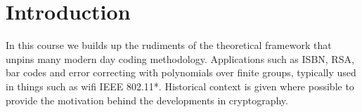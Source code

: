 \section{Introduction} %
\label{sec:introduction}
In this course we builds up the rudiments of the theoretical framework that unpins many modern day coding methodology.
Applications such as ISBN, RSA, bar codes and error correcting with polynomials over finite groups, typically used in things such as wifi IEEE 802.11*.
Historical context is given where possible to provide the motivation behind the developments in cryptography.


